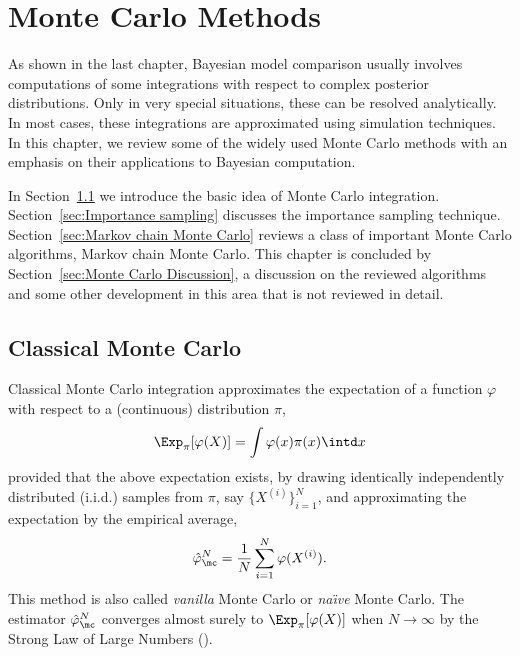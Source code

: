 \chapter{Monte Carlo Methods}
\label{cha:Monte Carlo Methods}

As shown in the last chapter, Bayesian model comparison usually involves
computations of some integrations with respect to complex posterior
distributions. Only in very special situations, these can be resolved
analytically. In most cases, these integrations are approximated using
simulation techniques. In this chapter, we review some of the widely used
Monte Carlo methods with an emphasis on their applications to Bayesian
computation.

In Section~\ref{sec:Classical Monte Carlo} we introduce the basic idea of
Monte Carlo integration. Section~\ref{sec:Importance sampling} discusses the
importance sampling technique. Section~\ref{sec:Markov chain Monte Carlo}
reviews a class of important Monte Carlo algorithms, Markov chain Monte Carlo.
This chapter is concluded by Section~\ref{sec:Monte Carlo Discussion}, a
discussion on the reviewed algorithms and some other development in this area
that is not reviewed in detail.

\section{Classical Monte Carlo}
\label{sec:Classical Monte Carlo}

Classical Monte Carlo integration approximates the expectation of a function
$\varphi$ with respect to a (continuous) distribution $\pi$,
\begin{equation*}
  \Exp_{\pi}[\varphi(X)] = \int\varphi(x)\pi(x)\intd x
\end{equation*}
provided that the above expectation exists, by drawing identically
independently distributed (i.i.d.) samples from
$\pi$, say $\{X^{(i)}\}_{i=1}^N$, and approximating the expectation by the
empirical average,
\begin{equation}
  \hat\varphi_{\mc}^N = \frac{1}{N}\sum_{i=1}^N\varphi(X^{(i)}).
  \label{eq:vanilla mc}
\end{equation}
This method is also called \emph{vanilla} Monte Carlo or \emph{na\"\i ve}
Monte Carlo. The estimator $\hat\varphi_{\mc}^N$ converges almost surely to
$\Exp_{\pi}[\varphi(X)]$ when $N\to\infty$ by the Strong Law of Large Numbers
(\slln).

